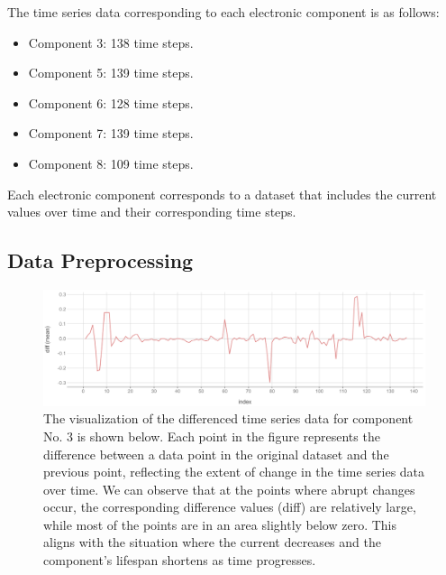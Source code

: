 The time series data corresponding to each electronic component is as follows:

\begin{itemize}
    \item Component 3: 138 time steps.
    \item Component 5: 139 time steps.
    \item Component 6: 128 time steps.
    \item Component 7: 139 time steps.
    \item Component 8: 109 time steps.
\end{itemize}

Each electronic component corresponds to a dataset that includes the current values over time and their corresponding time steps.

\subsection{Data Preprocessing}

\begin{figure}[H]
	\centering
	\includegraphics[width=\linewidth]{figures/No.3diff} 
	\caption{The visualization of the differenced time series data for component No. 3 is shown below. Each point in the figure represents the difference between a data point in the original dataset and the previous point, reflecting the extent of change in the time series data over time. We can observe that at the points where abrupt changes occur, the corresponding difference values (diff) are relatively large, while most of the points are in an area slightly below zero. This aligns with the situation where the current decreases and the component's lifespan shortens as time progresses.}
	\label{fig:No3_diff}
	
\end{figure}


